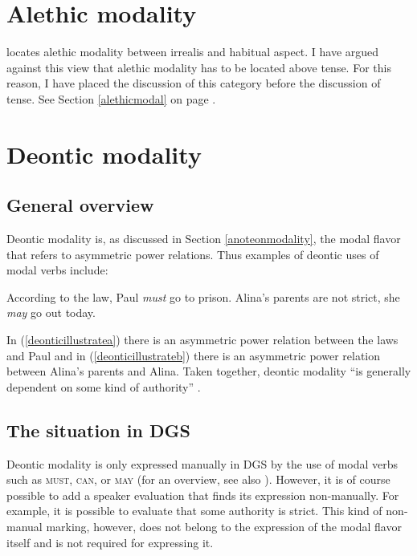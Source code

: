 \section{Alethic modality}
\citet{cinque1999adverbs} locates alethic modality between irrealis   and habitual aspect. I have argued against this view  that alethic modality has to be located above tense. For this reason, I have placed the discussion of this category before the discussion of tense. See Section \ref{alethicmodal} on page \pageref{alethicmodal}.

\section{Deontic modality}\label{deonticmodalsection}


\subsection{General overview}

Deontic modality is, as discussed in Section \ref{anoteonmodality}, the modal flavor that refers to asymmetric power relations. Thus examples of deontic uses of modal verbs include:

\begin{exe}
\ex\label{deonticillustrate}\begin{xlist}
\ex According to the law, Paul \textit{must} go to prison.\label{deonticillustratea}
\ex Alina's parents are not strict, she \textit{may} go out today.\label{deonticillustrateb}
\end{xlist}
\end{exe} 

\noindent In (\ref{deonticillustratea}) there is an asymmetric power relation between the laws and Paul and in (\ref{deonticillustrateb}) there is an asymmetric power relation between Alina's parents and Alina. Taken together, deontic modality ``is generally dependent on some kind of authority'' \citep[70]{palmer2001mood}.

\subsection{The situation in DGS}
Deontic modality is only expressed manually in DGS by the use of modal verbs such as \textsc{must}, \textsc{can}, or \textsc{may} (for an overview, see also \citealt{pfauquer2007syntaxofnegationandmodals}). However, it is of course possible to add a speaker evaluation that finds its expression non-manually. For example, it is possible to evaluate that some authority is strict. This kind of non-manual marking, however, does not belong to the expression of the modal flavor itself and is not required for expressing it.


